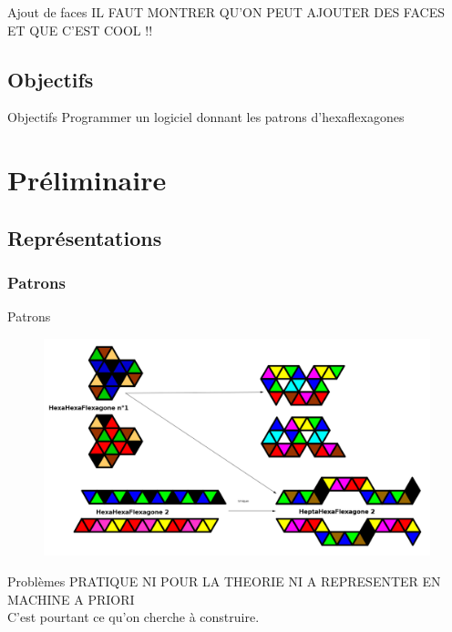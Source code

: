 \documentclass[french,xcolor=dvipsnames]{beamer}
\begin{document}
		\begin{frame}{Ajout de faces}
		IL FAUT MONTRER QU'ON PEUT AJOUTER DES FACES ET QUE C'EST COOL !!
		\end{frame}
		
		\subsection{Objectifs}
		\begin{frame}{Objectifs}
			Programmer un logiciel donnant les patrons d'hexaflexagones
		\end{frame}
		
		
	\section{Préliminaire}
	
		\subsection{Représentations}
		
		\subsubsection{Patrons}
		\begin{frame}{Patrons}
			\begin{figure}
				\includegraphics[scale=0.2]{exemples_patrons.png}
			\end{figure}
		\end{frame}
		
		\begin{frame}{Problèmes}
			PRATIQUE NI POUR LA THEORIE NI A REPRESENTER EN MACHINE A PRIORI\\
			C'est pourtant ce qu'on cherche à construire.
		\end{frame}
				
\end{document}
